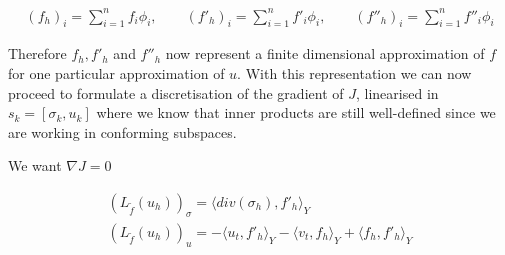 \documentclass[../draft_1.tex]{subfiles}
\begin{document}
\begin{ceqn}
	\begin{align}
(f_h)_i = \sum_{i=1}^{n} f_i \phi_i, \qquad (f'_h)_i = \sum_{i=1}^{n} f'_i \phi_i, \qquad (f''_h)_i = \sum_{i=1}^{n} f''_i \phi_i
	\end{align}
\end{ceqn}
Therefore $f_h, f'_h$ and $f''_h$ now represent a finite dimensional approximation of $f$ for one particular approximation of $u$. With this representation we can now proceed to formulate a discretisation of the gradient of $J$, linearised in $s_k = [\sigma_k, u_k]$ where we know that inner products are still well-defined since we are working in conforming subspaces.

We want $\nabla J = 0$

\begin{ceqn}
	\begin{align}
 (L_{\tilde{f}}(u_h))_{\sigma} = \langle div(\sigma_h), f'_h \rangle_Y\\
  (L_{\tilde{f}}(u_h))_{u} = - \langle u_t, f'_h \rangle_Y - \langle v_t, f_h \rangle_Y  + \langle f_h, f'_h \rangle_Y 
	\end{align}
\end{ceqn}
\end{document}
